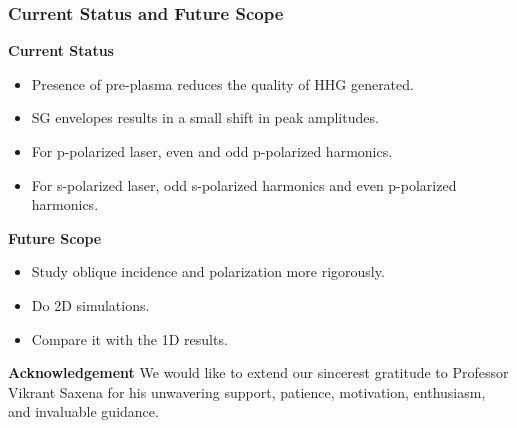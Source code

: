 \documentclass{beamer}
\begin{document}
\begin{frame}
    \frametitle{Current Status and Future Scope}
    \small
    \textbf{Current Status}
    \begin{itemize}
        \item Presence of pre-plasma reduces the quality of HHG generated.
        \item SG envelopes results in a small shift in peak amplitudes.
        \item For p-polarized laser, even and odd p-polarized harmonics.
        \item For s-polarized laser, odd s-polarized harmonics and even p-polarized harmonics.
    \end{itemize}
    \textbf{Future Scope}
    \begin{itemize}
        \item Study oblique incidence and polarization more rigorously.
        \item Do 2D simulations.
        \item Compare it with the 1D results.
    \end{itemize}
    \textbf{Acknowledgement}
    We would like to extend our sincerest gratitude to Professor Vikrant Saxena for his unwavering support, patience, motivation, enthusiasm, and invaluable guidance.
\end{frame}
\end{document}
